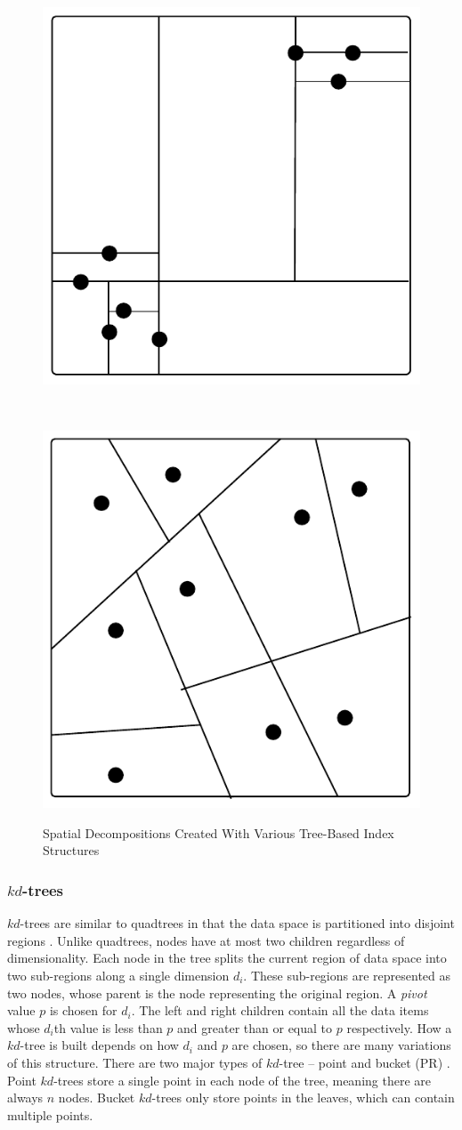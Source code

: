 \begin{figure}
\begin{center}
\begin{subfloat}{%
			\includegraphics[scale=0.4]{figures/kdtree_clustered.pdf}
		}
		\end{subfloat}~~~~~
		\begin{subfloat}{%
			\includegraphics[scale=0.4]{figures/bsp_tree.pdf}
		}
		\end{subfloat}
	\end{center}

	\caption{Spatial Decompositions Created With Various Tree-Based Index Structures}
	\label{fig:tree-based-decomposition}
\end{figure}

\subsubsection{$kd$-trees}

$kd$-trees are similar to quadtrees in that the data space is partitioned into disjoint regions \cite{kd-tree}. Unlike quadtrees, nodes have at most two children regardless of dimensionality. Each node in the tree splits the current region of data space into two sub-regions along a single dimension $d_i$. These sub-regions are represented as two nodes, whose parent is the node representing the original region. A \textit{pivot} value $p$ is chosen for $d_i$. The left and right children contain all the data items whose $d_i$th value is less than $p$ and greater than or equal to $p$ respectively. How a $kd$-tree is built depends on how $d_i$ and $p$ are chosen, so there are many variations of this structure. There are two major types of $kd$-tree -- point and bucket (PR) \cite{md-structures-samet}. Point $kd$-trees store a single point in each node of the tree, meaning there are always $n$ nodes. Bucket $kd$-trees only store points in the leaves, which can contain multiple points.

